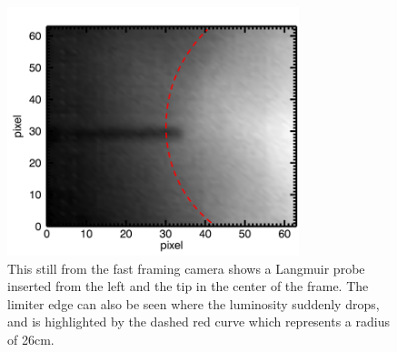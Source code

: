 \documentclass{jpp}
\begin{document}
\begin{figure}
\centerline{\includegraphics[width=8.5cm]{plot_movie_still}}
\caption{ This still from the fast framing camera shows a Langmuir probe inserted from the left and the tip in the center of the frame. The limiter edge can also be seen where the luminosity suddenly drops, and is highlighted by the dashed red curve which represents a radius of 26cm.}
\label{fig:plot_movie_still}
\end{figure}
\end{document}
